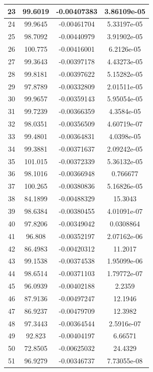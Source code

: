 \begin{table}[h]
{\begin{tabular}{|c|c|c|c|}
23 & 99.6019 & -0.00407383 & 3.86109e-05 \\ \hline 
24 & 99.9645 & -0.00461704 & 5.33197e-05 \\ \hline 
25 & 98.7092 & -0.00440979 & 3.91902e-05 \\ \hline 
26 & 100.775 & -0.00416001 & 6.2126e-05 \\ \hline 
27 & 99.3643 & -0.00397178 & 4.43273e-05 \\ \hline 
28 & 99.8181 & -0.00397622 & 5.15282e-05 \\ \hline 
29 & 97.8789 & -0.00332809 & 2.01511e-05 \\ \hline 
30 & 99.9657 & -0.00359143 & 5.95054e-05 \\ \hline 
31 & 99.7239 & -0.00366359 & 4.3584e-05 \\ \hline 
32 & 98.0351 & -0.00356509 & 4.60719e-07 \\ \hline 
33 & 99.4801 & -0.00364831 & 4.0398e-05 \\ \hline 
34 & 99.3881 & -0.00371637 & 2.09242e-05 \\ \hline 
35 & 101.015 & -0.00372339 & 5.36132e-05 \\ \hline 
36 & 98.1016 & -0.00366948 & 0.766677 \\ \hline 
37 & 100.265 & -0.00380836 & 5.16826e-05 \\ \hline 
38 & 84.1899 & -0.00488329 & 15.3043 \\ \hline 
39 & 98.6384 & -0.00380455 & 4.01091e-07 \\ \hline 
40 & 97.8206 & -0.00349042 & 0.0308864 \\ \hline 
41 & 96.808 & -0.00352197 & 2.07162e-06 \\ \hline 
42 & 86.4983 & -0.00420312 & 11.2017 \\ \hline 
43 & 99.1538 & -0.00374538 & 1.95099e-06 \\ \hline 
44 & 98.6514 & -0.00371103 & 1.79772e-07 \\ \hline 
45 & 96.0939 & -0.00402188 & 2.2359 \\ \hline 
46 & 87.9136 & -0.00497247 & 12.1946 \\ \hline 
47 & 86.9237 & -0.00479709 & 12.3982 \\ \hline 
48 & 97.3443 & -0.00364544 & 2.5916e-07 \\ \hline 
49 & 92.823 & -0.00404197 & 6.66571 \\ \hline 
50 & 72.8505 & -0.00625032 & 24.4329 \\ \hline 
51 & 96.9279 & -0.00346737 & 7.73055e-08 \\ \hline 

\end{tabular}}
\end{table}
